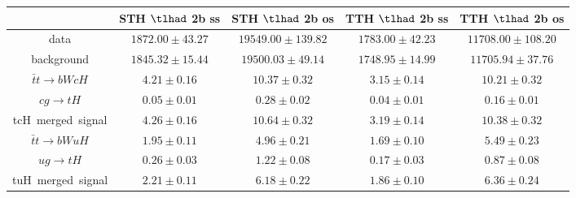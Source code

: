\begin{table}
\begin{tabular}{|c|c|c|c|c|}
\end{tabular}
\begin{tabular}{|c|c|c|c|c|} \hline
 & STH $\tlhad$ 2b ss & STH $\tlhad$ 2b os & TTH $\tlhad$ 2b ss & TTH $\tlhad$ 2b os\\\hline
data & $1872.00\pm43.27$ & $19549.00\pm139.82$ & $1783.00\pm42.23$ & $11708.00\pm108.20$\\\hline
background & $1845.32\pm15.44$ & $19500.03\pm49.14$ & $1748.95\pm14.99$ & $11705.94\pm37.76$\\\hline
$\bar{t}t\to bWcH$ & $4.21\pm0.16$ & $10.37\pm0.32$ & $3.15\pm0.14$ & $10.21\pm0.32$\\\hline
$cg\to tH$ & $0.05\pm0.01$ & $0.28\pm0.02$ & $0.04\pm0.01$ & $0.16\pm0.01$\\\hline
tcH~merged~signal & $4.26\pm0.16$ & $10.64\pm0.32$ & $3.19\pm0.14$ & $10.38\pm0.32$\\\hline
$\bar{t}t\to bWuH$ & $1.95\pm0.11$ & $4.96\pm0.21$ & $1.69\pm0.10$ & $5.49\pm0.23$\\\hline
$ug\to tH$ & $0.26\pm0.03$ & $1.22\pm0.08$ & $0.17\pm0.03$ & $0.87\pm0.08$\\\hline
tuH~merged~signal & $2.21\pm0.11$ & $6.18\pm0.22$ & $1.86\pm0.10$ & $6.36\pm0.24$\\\hline
\end{tabular}
\label{tab:yield}
\end{table}
